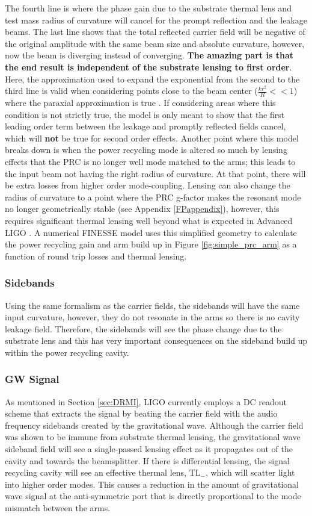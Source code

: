 		The fourth line is where the phase gain due to the substrate thermal lens and test mass radius of curvature will cancel for the prompt reflection and the leakage beams. The last line shows that the total reflected carrier field will be negative of the original amplitude with the same beam size and absolute curvature, however, now the beam is diverging instead of converging.  \textbf{The amazing part is that the end result is independent of the substrate lensing to first order}.  Here, the approximation used to expand the exponential from the second to the third line is valid when considering points close to the beam center ($\frac{k r^2}{R}<<1$) where the paraxial approximation is true \cite{Saleh}.  If considering areas where this condition is not strictly true, the model is only meant to show that the first leading order term between the leakage and promptly reflected fields cancel, which will \textbf{not} be true for second order effects.  Another point where this model breaks down is when the power recycling mode is altered so much by lensing effects that the PRC is no longer well mode matched to the arms; this leads to the input beam not having the right radius of curvature.  At that point, there will be extra losses from higher order mode-coupling.  Lensing can also change the radius of curvature to a point where the PRC g-factor makes the resonant mode no longer geometrically stable (see Appendix \ref{FPappendix}), however, this requires significant thermal lensing well beyond what is expected in Advanced LIGO \cite{Lawrence_TCS}.  A numerical FINESSE model uses this simplified geometry to calculate the power recycling gain and arm build up in Figure \ref{fig:simple_prc_arm} as a function of round trip losses and thermal lensing.
		\subsubsection{Sidebands}
		Using the same formalism as the carrier fields, the sidebands will have the same input curvature, however, they do not resonate in the arms so there is no cavity leakage field.  Therefore, the sidebands will see the phase change due to the substrate lens and this has very important consequences on the sideband build up within the power recycling cavity.
		\subsubsection{GW Signal}
		As mentioned in Section \ref{sec:DRMI}, LIGO currently employs a DC readout scheme that extracts the signal by beating the carrier field with the audio frequency sidebands created by the gravitational wave.  Although the carrier field was shown to be immune from substrate thermal lensing, the gravitational wave sideband field will see a single-passed lensing effect as it propagates out of the cavity and towards the beamsplitter.  If there is differential lensing, the signal recycling cavity will see an effective thermal lens, $\text{TL}_{-}$, which will scatter light into higher order modes.  This causes a reduction in the amount of gravitational wave signal at the anti-symmetric port that is directly proportional to the mode mismatch between the arms.
		
